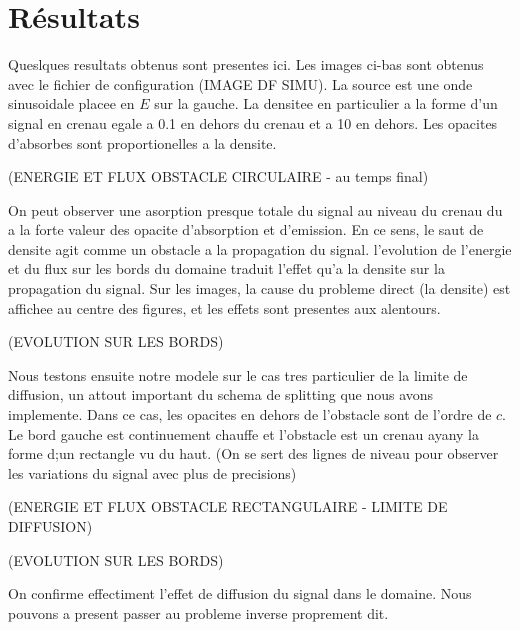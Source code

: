
\section{Résultats}

Queslques resultats obtenus sont presentes ici. Les images ci-bas sont obtenus avec le fichier de configuration (IMAGE DF SIMU). La source est une onde sinusoidale placee en $E$ sur la gauche. La densitee en particulier a la forme d'un signal en crenau egale a 0.1 en dehors du crenau et a 10 en dehors. Les opacites d'absorbes sont proportionelles a la densite.

(ENERGIE ET FLUX OBSTACLE CIRCULAIRE - au temps final)

On peut observer une asorption presque totale du signal au niveau du crenau du a la forte valeur des opacite d'absorption et d'emission. En ce sens, le saut de densite agit comme un obstacle a la propagation du signal. l'evolution de l'energie et du flux sur les bords du domaine traduit l'effet qu'a la densite sur la propagation du signal. Sur les images, la cause du probleme direct (la densite) est affichee au centre des figures, et les effets sont presentes aux alentours.

(EVOLUTION SUR LES BORDS)

Nous testons ensuite notre modele sur le cas tres particulier de la limite de diffusion, un attout important du schema de splitting que nous avons implemente. Dans ce cas, les opacites en dehors de l'obstacle sont de l'ordre de $c$. Le bord gauche est continuement chauffe et l'obstacle est un crenau ayany la forme d;un rectangle vu du haut. (On se sert des lignes de niveau pour observer les variations du signal avec plus de precisions)

(ENERGIE ET FLUX OBSTACLE RECTANGULAIRE - LIMITE DE DIFFUSION)

(EVOLUTION SUR LES BORDS)

On confirme effectiment l'effet de diffusion du signal dans le domaine. Nous pouvons a present passer au probleme inverse proprement dit. 

